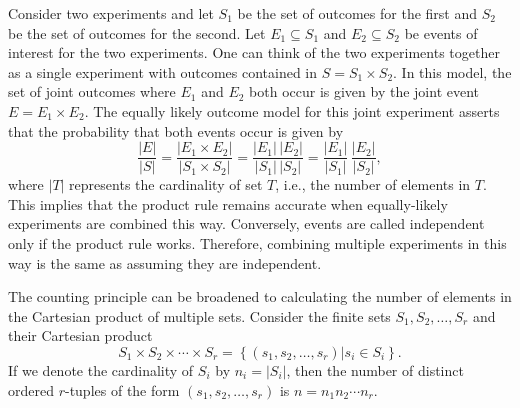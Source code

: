 \begin{example}
Consider two experiments and let $S_1$ be the set of outcomes for the first and $S_2$ be the set of outcomes for the second.
Let $E_1 \subseteq S_1$ and $E_2 \subseteq S_2$ be events of interest for the two experiments.
One can think of the two experiments together as a single experiment with outcomes contained in $S = S_1 \times S_2$.
In this model, the set of joint outcomes where $E_1$ and $E_2$ both occur is given by the joint event $E = E_1 \times E_2$.
The equally likely outcome model for this joint experiment asserts that the probability that both events occur is given by
\begin{equation*}
\frac{|E|}{|S|} = \frac{|E_1 \times E_2|}{|S_1 \times S_2|}
= \frac{|E_1|\,|E_2|}{|S_1|\,|S_2|}
= \frac{|E_1|}{|S_1|}\,\frac{|E_2|}{|S_2|},
\end{equation*}
where $|T|$ represents the cardinality of set $T$, i.e., the number of elements in $T$.
This implies that the product rule remains accurate when equally-likely experiments are combined this way.
Conversely, events are called independent only if the product rule works.
Therefore, combining multiple experiments in this way is the same as assuming they are independent.
\end{example}

The counting principle can be broadened to calculating the number of elements in the Cartesian product of multiple sets.
Consider the finite sets $S_1, S_2, \ldots, S_r$ and their Cartesian product
\begin{equation*}
S_1 \times S_2 \times \cdots \times S_r
= \left\{ (s_1, s_2, \ldots, s_r) | s_i \in S_i \right\} .
\end{equation*}
If we denote the cardinality of $S_i$ by $n_i = | S_i |$, then the number of distinct ordered $r$-tuples of the form $(s_1, s_2, \ldots, s_r)$ is $n = n_1 n_2 \cdots n_r$.

